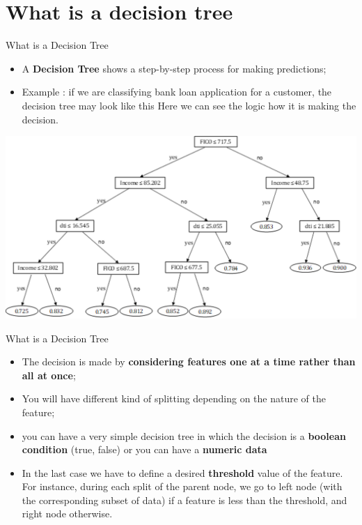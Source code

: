 \documentclass[11pt]{beamer}
\begin{document}
\section{What is a decision tree}{}
%
%
\begin{frame}{What is a Decision Tree}
	\begin{itemize}
		\item A \textbf{Decision Tree} shows a step-by-step process for making predictions;
		\item Example : if we are classifying bank loan application for a customer, the decision tree may look like this
Here we can see the logic how it is making the decision.
	\end{itemize}
	\begin{center}
	\includegraphics[scale=.3]{../05-pictures/lesson-3-3_pic_0.png}
	\end{center}
\end{frame}
%
%
\begin{frame}{What is a Decision Tree}
	\begin{itemize}
		\item The decision is made by \textbf{considering features one at a time rather than all at once};
\item You will have different kind of splitting depending on the nature of the feature;
\item you can have a very simple decision tree in which the decision is a \textbf{boolean condition} (true, false) or you can have a \textbf{numeric data}
\item In the last case we have to define a desired \textbf{threshold} value of the feature. For instance, during each split of the parent node, we go to left node (with the corresponding subset of data) if a feature is less than the threshold, and right node otherwise.	
\end{itemize}
\end{frame}
\end{document}

